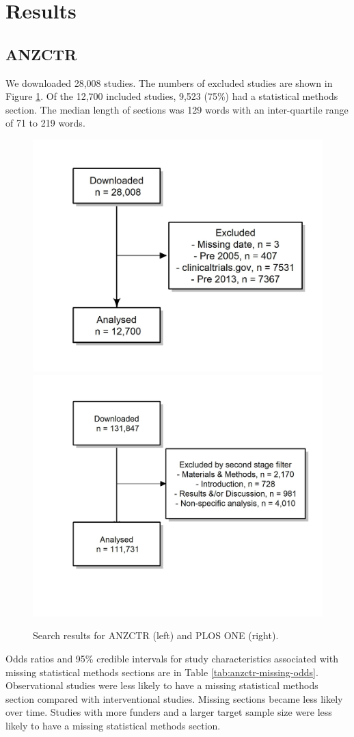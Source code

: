 \documentclass[12pt]{article}
\begin{document}
\clearpage

\section{Results}\label{results}

\subsection{ANZCTR}

We downloaded 28,008 studies. The numbers of excluded studies are shown
in Figure \ref{fig:consort-diagrams}. Of the 12,700 included studies,
9,523 (75\%) had a statistical methods section. The median length of
sections was 129 words with an inter-quartile range of 71 to 219 words.

\begin{figure}[htbp]

{\centering \includegraphics[width=0.49\linewidth]{figures/excluded_anzctr_missing}  \includegraphics[width=0.49\linewidth]{figures/excluded_plosone}

}

\caption{\label{fig:consort-diagrams}Search results for ANZCTR (left) and PLOS ONE (right).}
\end{figure}


Odds ratios and 95\% credible intervals for study characteristics
associated with missing statistical methods sections are in Table
\ref{tab:anzctr-missing-odds}. Observational studies were less likely to
have a missing statistical methods section compared with interventional
studies. Missing sections became less likely over time. Studies with
more funders and a larger target sample size were less likely to have a
missing statistical methods section.
\end{document}
